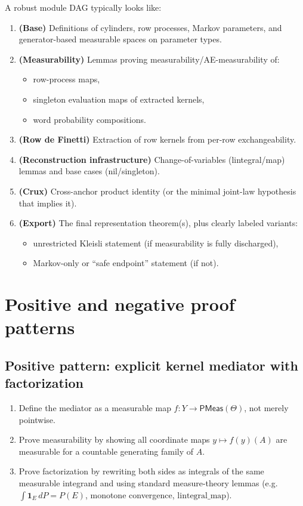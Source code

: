 \documentclass[11pt]{article}
\newcommand{\ProbMeas}{\mathsf{PMeas}}
\begin{document}
A robust module DAG typically looks like:

\begin{enumerate}[label=\textbf{L\arabic*.}]
\item \textbf{(Base)} Definitions of cylinders, row processes, Markov parameters, and
generator-based measurable spaces on parameter types.
\item \textbf{(Measurability)} Lemmas proving measurability/AE-measurability of:
\begin{itemize}
\item row-process maps,
\item singleton evaluation maps of extracted kernels,
\item word probability compositions.
\end{itemize}
\item \textbf{(Row de Finetti)} Extraction of row kernels from per-row exchangeability.
\item \textbf{(Reconstruction infrastructure)} Change-of-variables (lintegral/map) lemmas and base cases
(nil/singleton).
\item \textbf{(Crux)} Cross-anchor product identity (or the minimal joint-law hypothesis that implies it).
\item \textbf{(Export)} The final representation theorem(s), plus clearly labeled variants:
\begin{itemize}
\item unrestricted Kleisli statement (if measurability is fully discharged),
\item Markov-only or ``safe endpoint'' statement (if not).
\end{itemize}
\end{enumerate}

\section{Positive and negative proof patterns}

\subsection{Positive pattern: explicit kernel mediator with factorization}
\begin{enumerate}[label=(\roman*)]
\item Define the mediator as a measurable map $f : Y \to \ProbMeas(\Theta)$, not merely pointwise.
\item Prove measurability by showing all coordinate maps $y \mapsto f(y)(A)$ are measurable for a
countable generating family of $A$.
\item Prove factorization by rewriting both sides as integrals of the same measurable integrand and
using standard measure-theory lemmas (e.g.\ $\int \mathbf{1}_E\,dP = P(E)$, monotone convergence,
$\mathrm{lintegral\_map}$).
\end{enumerate}
\end{document}
